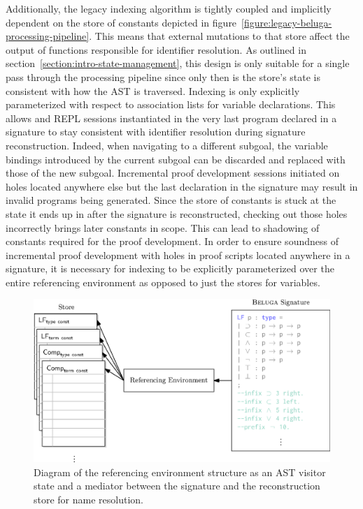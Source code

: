 Additionally, the legacy indexing algorithm is tightly coupled and implicitly dependent on the store of constants depicted in figure~\ref{figure:legacy-beluga-processing-pipeline}.
This means that external mutations to that store affect the output of functions responsible for identifier resolution.
As outlined in section~\ref{section:intro-state-management}, this design is only suitable for a single pass through the processing pipeline since only then is the store's state is consistent with how the \ac{AST} is traversed.
Indexing is only explicitly parameterized with respect to association lists for variable declarations.
This allows \Harpoon and \ac{REPL} sessions instantiated in the very last program declared in a \Beluga signature to stay consistent with identifier resolution during signature reconstruction.
Indeed, when navigating to a different \Harpoon subgoal, the variable bindings introduced by the current subgoal can be discarded and replaced with those of the new subgoal.
Incremental proof development sessions initiated on holes located anywhere else but the last declaration in the signature may result in invalid programs being generated.
Since the store of constants is stuck at the state it ends up in after the signature is reconstructed, checking out those holes incorrectly brings later constants in scope.
This can lead to shadowing of constants required for the proof development.
In order to ensure soundness of incremental proof development with holes in proof scripts located anywhere in a signature, it is necessary for indexing to be explicitly parameterized over the entire referencing environment as opposed to just the stores for variables.

\begin{figure}[htb]
\centering
\includegraphics{figures/referencing-environment-architecture.eps}
\caption[Role of the referencing environment in \Beluga]{%
Diagram of the referencing environment structure as an \ac{AST} visitor state and a mediator between the \Beluga signature and the reconstruction store for name resolution.
}
\label{figure:referencing-environment-architecture}
\end{figure}

